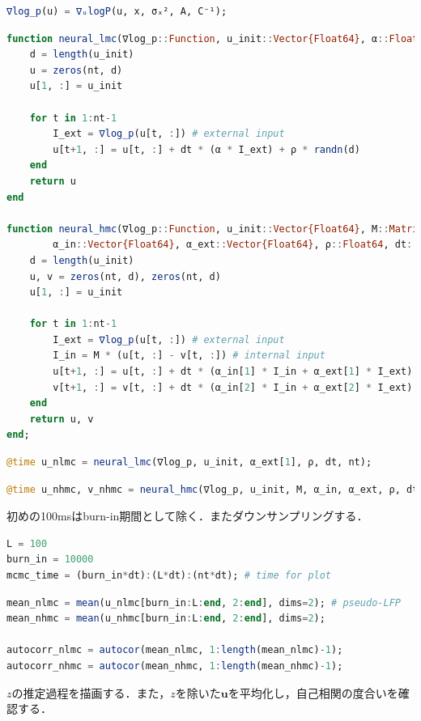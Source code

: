 \begin{lstlisting}[language=julia]
∇log_p(u) = ∇ᵤlogP(u, x, σₓ², A, C⁻¹);
\end{lstlisting}
\begin{lstlisting}[language=julia]
function neural_lmc(∇log_p::Function, u_init::Vector{Float64}, α::Float64, ρ::Float64, dt::Float64, nt::Int)
    d = length(u_init)
    u = zeros(nt, d)
    u[1, :] = u_init

    for t in 1:nt-1
        I_ext = ∇log_p(u[t, :]) # external input
        u[t+1, :] = u[t, :] + dt * (α * I_ext) + ρ * randn(d) 
    end
    return u
end

function neural_hmc(∇log_p::Function, u_init::Vector{Float64}, M::Matrix{Float64}, 
        α_in::Vector{Float64}, α_ext::Vector{Float64}, ρ::Float64, dt::Float64, nt::Int)
    d = length(u_init)
    u, v = zeros(nt, d), zeros(nt, d)
    u[1, :] = u_init

    for t in 1:nt-1
        I_ext = ∇log_p(u[t, :]) # external input
        I_in = M * (u[t, :] - v[t, :]) # internal input
        u[t+1, :] = u[t, :] + dt * (α_in[1] * I_in + α_ext[1] * I_ext) + ρ * randn(d) 
        v[t+1, :] = v[t, :] + dt * (α_in[2] * I_in + α_ext[2] * I_ext) + ρ * randn(d)
    end
    return u, v
end;
\end{lstlisting}
\begin{lstlisting}[language=julia]
@time u_nlmc = neural_lmc(∇log_p, u_init, α_ext[1], ρ, dt, nt);
\end{lstlisting}
\begin{lstlisting}[language=julia]
@time u_nhmc, v_nhmc = neural_hmc(∇log_p, u_init, M, α_in, α_ext, ρ, dt, nt);
\end{lstlisting}
初めの100msはburn-in期間として除く．またダウンサンプリングする．
\begin{lstlisting}[language=julia]
L = 100
burn_in = 10000
mcmc_time = (burn_in*dt):(L*dt):(nt*dt); # time for plot
\end{lstlisting}
\begin{lstlisting}[language=julia]
mean_nlmc = mean(u_nlmc[burn_in:L:end, 2:end], dims=2); # pseudo-LFP
mean_nhmc = mean(u_nhmc[burn_in:L:end, 2:end], dims=2);

autocorr_nlmc = autocor(mean_nlmc, 1:length(mean_nlmc)-1);
autocorr_nhmc = autocor(mean_nhmc, 1:length(mean_nhmc)-1);
\end{lstlisting}
$z$の推定過程を描画する．また，$z$を除いた$\mathbf{u}$を平均化し，自己相関の度合いを確認する．
